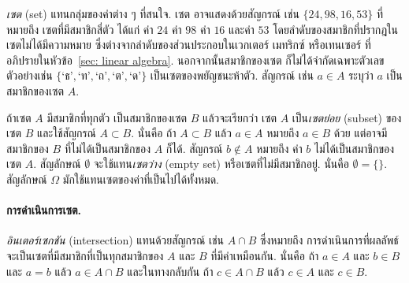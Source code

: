 %
\textit{เซต} (set)
แทนกลุ่มของค่าต่าง ๆ ที่สนใจ. 
เซต อาจแสดงด้วยสัญกรณ์ เช่น $\{24, 98, 16, 53 \}$ ที่หมายถึง เซตที่มีสมาชิกสี่ตัว ได้แก่ ค่า $24$ ค่า $98$
ค่า $16$
และค่า $53$
โดยลำดับของสมาชิกที่ปรากฎในเซตไม่ได้มีความหมาย ซึ่งต่างจากลำดับของส่วนประกอบในเวกเตอร์ เมทริกซ์ หรือเทนเซอร์  ที่อภิปรายในหัวข้อ~\ref{sec: linear algebra}.
นอกจากนั้นสมาชิกของเซต ก็ไม่ได้จำกัดเฉพาะตัวเลข ตัวอย่างเช่น $\{ \mbox{`ธ'}, \mbox{`ท'}, \mbox{`ถ'}, \mbox{`ต'}, \mbox{`ด'}\}$ เป็นเซตของพยัญชนะห้าตัว.
สัญกรณ์ เช่น $a \in A$ ระบุว่า $a$ เป็นสมาชิกของเซต $A$.


ถ้าเซต $A$ มีสมาชิกที่ทุกตัว 
เป็นสมาชิกของเซต $B$
แล้วจะเรียกว่า เซต $A$ 
เป็น\textit{เซตย่อย} (subset) 
ของเซต $B$
และใช้สัญกรณ์ $A \subset B$.
นั่นคือ ถ้า $A \subset B$
แล้ว $a \in A$ หมายถึง $a \in B$ ด้วย
แต่อาจมีสมาชิกของ $B$ ที่ไม่ได้เป็นสมาชิกของ $A$ ก็ได้.
สัญกรณ์ $b \notin A$ หมายถึง ค่า $b$ ไม่ได้เป็นสมาชิกของเซต $A$.
%
สัญลักษณ์ $\emptyset$ 
จะใช้แทน\textit{เซตว่าง} (empty set) หรือเซตที่ไม่มีสมาชิกอยู่.
นั่นคือ $\emptyset = \{ \}$.
%
สัญลักษณ์ $\Omega$
มักใช้แทนเซตของค่าที่เป็นไปได้ทั้งหมด.

\paragraph{การดำเนินการเซต.}
\textit{อินเตอร์เซกชัน} (intersection)
แทนด้วยสัญกรณ์ 
เช่น $A \cap B$ ซึ่งหมายถึง การดำเนินการที่ผลลัพธ์จะเป็นเซตที่มีสมาชิกที่เป็นทุกสมาชิกของ $A$ และ $B$ ที่มีค่าเหมือนกัน.
นั่นคือ ถ้า $a \in A$ และ $b \in B$ และ $a = b$ แล้ว $a \in A \cap B$ 
และในทางกลับกัน
ถ้า $c \in A \cap B$ แล้ว $c \in A$ และ $c \in B$.

